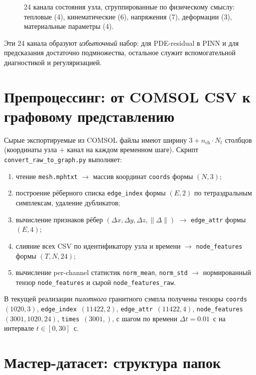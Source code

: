 \documentclass[12pt]{article}
\begin{document}
\begin{figure}[h]
\centering

\caption{24 канала состояния узла, сгруппированные по физическому смыслу:
тепловые (4), кинематические (6), напряжения (7), деформации (3),
материальные параметры (4).}
\label{fig:sample}
\end{figure}

\noindent
Эти 24 канала образуют \emph{избыточный} набор: для PDE-residual в PINN
и для предсказания достаточно подмножества, остальное служит
вспомогательной диагностикой и регуляризацией.

\section{Препроцессинг: от COMSOL CSV к графовому представлению}

Сырые экспортируемые из COMSOL файлы имеют ширину
$3 + n_{\mathrm{ch}}\cdot N_t$ столбцов
(координаты узла $+$ канал на каждом временном шаге).
Скрипт \texttt{convert\_raw\_to\_graph.py} выполняет:
\begin{enumerate}[leftmargin=1.4em,itemsep=2pt]
\item чтение \texttt{mesh.mphtxt} $\rightarrow$ массив координат
      \texttt{coords} формы $(N,3)$;
\item построение рёберного списка \texttt{edge\_index} формы $(E,2)$
      по тетраэдральным симплексам, удаление дубликатов;
\item вычисление признаков рёбер
      $(\Delta x, \Delta y, \Delta z, \|\Delta\|)$
      $\rightarrow$ \texttt{edge\_attr} формы $(E,4)$;
\item слияние всех CSV по идентификатору узла и времени
      $\rightarrow$ \texttt{node\_features} формы $(T,N,24)$;
\item вычисление per-channel статистик
      \texttt{norm\_mean}, \texttt{norm\_std}
      $\rightarrow$ нормированный тензор \texttt{node\_features}
      и сырой \texttt{node\_features\_raw}.
\end{enumerate}

В текущей реализации \emph{пилотного} гранитного сэмпла получены тензоры
\texttt{coords}~$(1020,3)$,
\texttt{edge\_index}~$(11422,2)$,
\texttt{edge\_attr}~$(11422,4)$,
\texttt{node\_features}~$(3001,1020,24)$,
\texttt{times}~$(3001,)$,
с шагом по времени $\Delta t = 0.01$~с на интервале $t\in[0,30]$~с.

\section{Мастер-датасет: структура папок}
\end{document}
